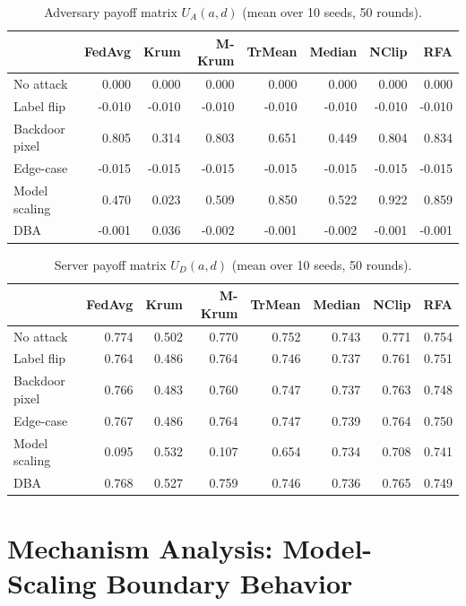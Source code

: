 \documentclass{article}
\begin{document}
\begin{table}[h]
\caption{Adversary payoff matrix $U_A(a,d)$ (mean over 10 seeds, 50 rounds).}
\label{tab:adv_payoff}
\centering
\small
\begin{tabular}{l|rrrrrrr}
\toprule
 & FedAvg & Krum & M-Krum & TrMean & Median & NClip & RFA \\
\midrule
No attack      &  0.000 &  0.000 &  0.000 &  0.000 &  0.000 &  0.000 &  0.000 \\
Label flip     & -0.010 & -0.010 & -0.010 & -0.010 & -0.010 & -0.010 & -0.010 \\
Backdoor pixel &  0.805 &  0.314 &  0.803 &  0.651 &  0.449 &  0.804 &  0.834 \\
Edge-case      & -0.015 & -0.015 & -0.015 & -0.015 & -0.015 & -0.015 & -0.015 \\
Model scaling  &  0.470 &  0.023 &  0.509 &  0.850 &  0.522 &  0.922 &  0.859 \\
DBA            & -0.001 &  0.036 & -0.002 & -0.001 & -0.002 & -0.001 & -0.001 \\
\bottomrule
\end{tabular}
\end{table}

\begin{table}[h]
\caption{Server payoff matrix $U_D(a,d)$ (mean over 10 seeds, 50 rounds).}
\label{tab:srv_payoff}
\centering
\small
\begin{tabular}{l|rrrrrrr}
\toprule
 & FedAvg & Krum & M-Krum & TrMean & Median & NClip & RFA \\
\midrule
No attack      & 0.774 & 0.502 & 0.770 & 0.752 & 0.743 & 0.771 & 0.754 \\
Label flip     & 0.764 & 0.486 & 0.764 & 0.746 & 0.737 & 0.761 & 0.751 \\
Backdoor pixel & 0.766 & 0.483 & 0.760 & 0.747 & 0.737 & 0.763 & 0.748 \\
Edge-case      & 0.767 & 0.486 & 0.764 & 0.747 & 0.739 & 0.764 & 0.750 \\
Model scaling  & 0.095 & 0.532 & 0.107 & 0.654 & 0.734 & 0.708 & 0.741 \\
DBA            & 0.768 & 0.527 & 0.759 & 0.746 & 0.736 & 0.765 & 0.749 \\
\bottomrule
\end{tabular}
\end{table}

\section{Mechanism Analysis: Model-Scaling Boundary Behavior}
\label{app:mechanism}
\end{document}
